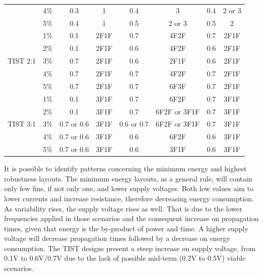 \documentclass[pgmicro,diss,english]{iiufrgs}
\begin{document}
\begin{table}[t]
{\begin{tabular}{|c|c|c|c|c|c|c|c|}
                          & 4\% & 0.3        & 1      & 0.4        & 3            & 0.4        & 2 or 3 \\ \cline{2-8}
                          & 5\% & 0.4        & 1      & 0.5        & 2 or 3       & 0.5        & 2      \\ \hline
\multirow{5}{*}{TIST 2:1} & 1\% & 0.1        & 2F1F   & 0.7        & 4F2F         & 0.7        & 2F1F   \\ \cline{2-8}
                          & 2\% & 0.1        & 2F1F   & 0.6        & 4F2F         & 0.6        & 2F1F   \\ \cline{2-8}
                          & 3\% & 0.7        & 2F1F   & 0.6        & 2F1F         & 0.6        & 2F1F   \\ \cline{2-8}
                          & 4\% & 0.7        & 2F1F   & 0.7        & 4F2F         & 0.7        & 2F1F   \\ \cline{2-8}
                          & 5\% & 0.7        & 2F1F   & 0.7        & 6F3F         & 0.7        & 2F1F   \\ \hline
\multirow{5}{*}{TIST 3:1} & 1\% & 0.1        & 3F1F   & 0.7        & 6F2F         & 0.7        & 3F1F   \\ \cline{2-8}
                          & 2\% & 0.1        & 3F1F   & 0.7        & 6F2F or 3F1F & 0.7        & 3F1F   \\ \cline{2-8}
                          & 3\% & 0.7 or 0.6 & 3F1F   & 0.6 or 0.7 & 6F2F or 3F1F & 0.7        & 3F1F   \\ \cline{2-8}
                          & 4\% & 0.7 or 0.6 & 3F1F   & 0.6        & 6F2F         & 0.6        & 3F1F   \\ \cline{2-8}
                          & 5\% & 0.7 or 0.6 & 3F1F   & 0.6        & 3F1F         & 0.6        & 3F1F   \\ \hline
\end{tabular}
}
\end{table}

	It is possible to identify patterns concerning the minimum energy and highest robustness layouts. The minimum energy layouts, as a general rule, will contain only few fins, if not only one, and lower supply voltages. Both low values aim to lower currents and increase resistance, therefore decreasing energy consumption. As variability rises, the supply voltage rises as well. That is due to the lower frequencies applied in those scenarios and the consequent increase on propagation times, given that energy is the by-product of power and time. A higher supply voltage will decrease propagation times followed by a decrease on energy consumption. The TIST designs present a steep increase on supply voltage, from 0.1V to 0.6V/0.7V due to the lack of possible mid-term (0.2V to 0.5V) viable scenarios.
\end{document}
